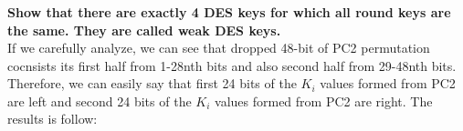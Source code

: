 \documentclass[11pt]{article}
\begin{document}
\newpage
\subsubsection{}\textbf{Show that there are exactly 4 DES keys for which all round keys are the same. They are
called weak DES keys.}\\


If we carefully analyze, we can see that dropped 48-bit of PC2 permutation cocnsists its first half from 1-28nth bits and also second half
from 29-48nth bits. Therefore, we can easily say that first 24 bits of the $K_{i}$ values formed from PC2 are left and second 24 bits of the $K_{i}$ values
formed from PC2 are right. The results is follow:

\begin{figure}[ht!]
  \centering
  \quad
  \\

\end{figure}
\end{document}
